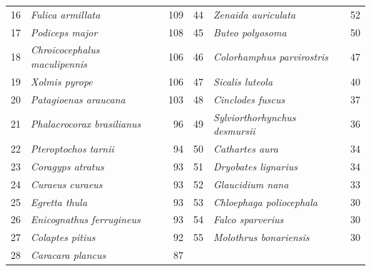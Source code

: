 \documentclass[10pt]{article}
\begin{document}
\begin{table}[!ht]
{\begin{tabular}{rlr | rlr}
   16 & \textit{Fulica armillata} & 109 & 44 & \textit{Zenaida auriculata} &  52 \\
   17 & \textit{Podiceps major} & 108 & 45 & \textit{Buteo polyosoma} &  50  \\
   18 & \textit{Chroicocephalus maculipennis} & 106 & 46 & \textit{Colorhamphus parvirostris} &  47 \\
   19 & \textit{Xolmis pyrope} & 106 & 47 & \textit{Sicalis luteola} &  40 \\ 
   20 & \textit{Patagioenas araucana} & 103 & 48 & \textit{Cinclodes fuscus} &  37 \\
   21 & \textit{Phalacrocorax brasilianus} &  96 & 49 & \textit{Sylviorthorhynchus desmursii} &  36 \\
   22 & \textit{Pteroptochos tarnii} &  94 & 50 & \textit{Cathartes aura} &  34 \\
   23 & \textit{Coragyps atratus} &  93 & 51 & \textit{Dryobates lignarius} &  34 \\
   24 & \textit{Curaeus curaeus} &  93 & 52 & \textit{Glaucidium nana} &  33 \\
   25 & \textit{Egretta thula} &  93 & 53 & \textit{Chloephaga poliocephala} &  30 \\ 
   26 & \textit{Enicognathus ferrugineus} &  93 & 54 & \textit{Falco sparverius} &  30 \\
   27 & \textit{Colaptes pitius} &  92 & 55 & \textit{Molothrus bonariensis} &  30 \\
   28 & \textit{Caracara plancus} &  87 \\  
   \hline
\end{tabular}}
\label{tab:birds}
\end{table}
\end{document}
